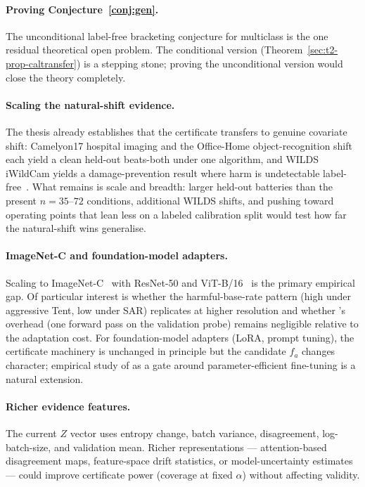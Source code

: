 \paragraph{Proving Conjecture~\ref{conj:gen}.}
The unconditional label-free bracketing conjecture for multiclass is the one
residual theoretical open problem.  The conditional version (Theorem~\ref{sec:t2-prop-caltransfer})
is a stepping stone; proving the unconditional version would close the theory
completely.

\paragraph{Scaling the natural-shift evidence.}
The thesis already establishes that the certificate transfers to genuine covariate
shift: Camelyon17 hospital imaging and the Office-Home object-recognition shift each
yield a clean held-out beats-both under one algorithm, and WILDS iWildCam yields a
damage-prevention result where harm is undetectable label-free~\cite{koh2021wilds,venkateswara2017officehome}.
What remains is scale and breadth: larger held-out batteries than the present
$n{=}35$--$72$ conditions, additional WILDS shifts, and pushing toward
operating points that lean less on a labeled calibration split would test how far the
natural-shift wins generalise.

\paragraph{ImageNet-C and foundation-model adapters.}
Scaling to ImageNet-C~\cite{hendrycks2019benchmarking} with ResNet-50 and
ViT-B/16~\cite{dosovitskiy2021vit,he2016resnet} is the primary empirical gap.
Of particular interest is whether the harmful-base-rate pattern (high under
aggressive Tent, low under SAR) replicates at higher resolution and whether
\KGA{}'s overhead (one forward pass on the validation probe) remains negligible
relative to the adaptation cost.  For foundation-model adapters (LoRA, prompt
tuning), the certificate machinery is unchanged in principle but the candidate
$f_a$ changes character; empirical study of \KGA{} as a gate around parameter-efficient
fine-tuning is a natural extension.

\paragraph{Richer evidence features.}
The current $Z$ vector uses entropy change, batch variance, disagreement, log-batch-size,
and validation mean.  Richer representations --- attention-based disagreement maps,
feature-space drift statistics, or model-uncertainty estimates --- could improve
certificate power (coverage at fixed $\alpha$) without affecting validity.

